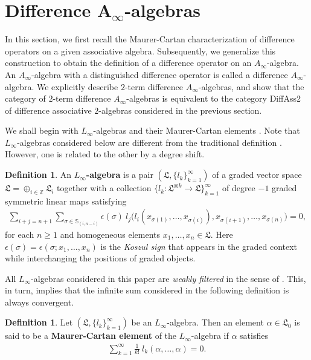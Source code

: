\documentclass[a4paper,reqno,10pt]{amsart}
\theoremstyle{plain}
\theoremstyle{definition}
\newtheorem{defn}[thm]{Definition}
\theoremstyle{remark}
\begin{document}
\section{Difference A$_\infty$-algebras}\label{sec4}

In this section, we first recall the Maurer-Cartan characterization of difference operators on a given associative algebra. Subsequently, we generalize this construction to obtain the definition of a difference operator on an $A_\infty$-algebra. An $A_\infty$-algebra with a distinguished difference operator is called a difference $A_\infty$-algebra. We explicitly describe $2$-term difference $A_\infty$-algebras, and show that the category of $2$-term difference $A_\infty$-algebras is equivalent to the category {\sf DiffAss2} of difference associative $2$-algebras considered in the previous section.

\medskip

We shall begin with $L_\infty$-algebras and their Maurer-Cartan elements \cite{lada-markl,lada-s,getzler}. Note that $L_\infty$-algebras considered below are different from the traditional definition \cite{lada-markl}. However, one is related to the other by a degree shift.

\begin{defn}
    An {\bf $L_\infty$-algebra} is a pair $(\mathfrak{L}, \{ l_k \}_{k=1}^\infty)$ of a graded vector space $\mathfrak{L} = \oplus_{i \in \mathbb{Z}} \mathfrak{L}_i$ together with a collection $\{ l_k : \mathfrak{L}^{\otimes k} \rightarrow \mathfrak{L} \}_{k=1}^\infty$ of degree $-1$ graded symmetric linear maps satisfying 
    \begin{align*}
        \sum_{i+j = n+1} \sum_{\sigma \in \mathbb{S}_{(i, n-i)}} \epsilon (\sigma) ~ \! l_j \big(  l_i ( x_{\sigma (1)}, \ldots, x_{\sigma (i)}) , x_{\sigma (i+1)}, \ldots, x_{\sigma (n)} \big) = 0,
    \end{align*}
    for each $n \geq 1$ and homogeneous elements $x_1, \ldots, x_n \in \mathfrak{L}$. Here $\epsilon (\sigma) = \epsilon (\sigma; x_1, \ldots, x_n)$ is the {\em Koszul sign} that appears in the graded context while interchanging the positions of graded objects.
\end{defn}

All $L_\infty$-algebras considered in this paper are {\em weakly filtered} in the sense of \cite{getzler}. This, in turn, implies that the infinite sum considered in the following definition is always convergent.

\begin{defn}
    Let $(\mathfrak{L}, \{ l_k \}_{k=1}^\infty)$ be an $L_\infty$-algebra. Then an element $\alpha \in \mathfrak{L}_0$ is said to be a {\bf Maurer-Cartan element} of the $L_\infty$-algebra if $\alpha$ satisfies
    \begin{align*}
        \sum_{k=1}^\infty \frac{1}{k! } ~ \! l_k (\alpha, \ldots, \alpha) = 0.
    \end{align*}
\end{defn}
\end{document}
